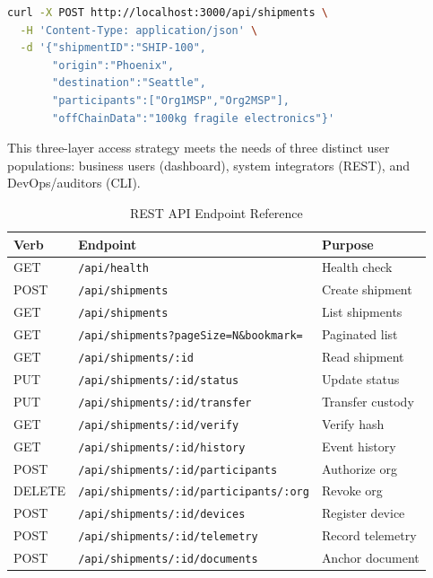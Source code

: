 \documentclass[conference]{IEEEtran}
\begin{document}
\begin{lstlisting}[language=bash]
curl -X POST http://localhost:3000/api/shipments \
  -H 'Content-Type: application/json' \
  -d '{"shipmentID":"SHIP-100",
       "origin":"Phoenix",
       "destination":"Seattle",
       "participants":["Org1MSP","Org2MSP"],
       "offChainData":"100kg fragile electronics"}'
\end{lstlisting}

This three-layer access strategy meets the needs of three distinct user
populations: business users (dashboard), system integrators (REST), and
DevOps/auditors (CLI).

\begin{table}[!t]
\caption{REST API Endpoint Reference}
\label{tab:rest}
\centering
\scriptsize
\renewcommand{\arraystretch}{1.02}
\setlength{\tabcolsep}{2.5pt}
\begin{tabularx}{\columnwidth}{@{}l p{} X@{}}
\toprule
\textbf{Verb} & \textbf{Endpoint} & \textbf{Purpose} \\
\midrule
GET    & \texttt{/api/health} & Health check \\
POST   & \texttt{/api/shipments} & Create shipment \\
GET    & \texttt{/api/shipments} & List shipments \\
GET    & \texttt{/api/shipments?pageSize=N\&bookmark=} & Paginated list \\
GET    & \texttt{/api/shipments/:id} & Read shipment \\
PUT    & \texttt{/api/shipments/:id/status} & Update status \\
PUT    & \texttt{/api/shipments/:id/transfer} & Transfer custody \\
GET    & \texttt{/api/shipments/:id/verify} & Verify hash \\
GET    & \texttt{/api/shipments/:id/history} & Event history \\
POST   & \texttt{/api/shipments/:id/participants} & Authorize org \\
DELETE & \texttt{/api/shipments/:id/participants/:org} & Revoke org \\
POST   & \texttt{/api/shipments/:id/devices} & Register device \\
POST   & \texttt{/api/shipments/:id/telemetry} & Record telemetry \\
POST   & \texttt{/api/shipments/:id/documents} & Anchor document \\
\bottomrule
\end{tabularx}
\end{table}
\end{document}
